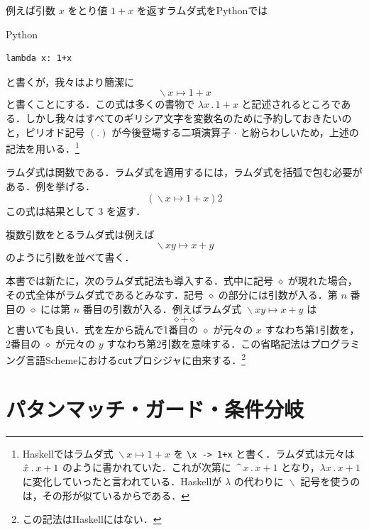 \documentclass[a5paper,twoside,fleqn,draft]{jsbook}
\newcommand{\programminglanguage}[1]{\textsf{#1}}
\newcommand{\haskell}{\programminglanguage{Haskell}}
\newcommand{\python}{\programminglanguage{Python}}
\newcommand{\scheme}{\programminglanguage{Scheme}}
\newcommand{\code}[1]{\texttt{#1}}
\newenvironment{pythoncode}{\begin{itembox}[r]{\python}}{\end{itembox}}
\newcommand{\mAnonParam}{\diamond}
\DeclareMathOperator{\mLambda}{\backslash}
\DeclareMathOperator{\mLambdaArrow}{\mapsto}
\newcommand{\mLambdaEXP}[2]{\mLambda{#1}\mLambdaArrow{#2}} %
\begin{document}
例えば引数 $x$ をとり値 $1+x$ を返すラムダ式を\python では
\begin{pythoncode}
\begin{verbatim}
lambda x: 1+x
\end{verbatim}
\end{pythoncode}
と書くが，我々はより簡潔に
\begin{equation}
  \mLambda x\mLambdaArrow1+x
\end{equation}
と書くことにする．この式は多くの書物で $\lambda x\mathbin{.}1+x$ と記述されるところである．しかし我々はすべてのギリシア文字を変数名のために予約しておきたいのと，ピリオド記号 $(.)$ が今後登場する二項演算子 $\cdot$ と紛らわしいため，上述の記法を用いる．\footnote{\haskell ではラムダ式 $\mLambda x\mLambdaArrow1+x$ を \code{\textbackslash x -> 1+x} と書く．ラムダ式は元々は $\Hat x\mathbin{.}x+1$ のように書かれていた．これが次第に $\mathop{\texttt{\textasciicircum}}x\mathbin{.}x+1$ となり，$\lambda x\mathbin{.}x+1$ に変化していったと言われている．\haskell が $\lambda$ の代わりに $\mLambda$ 記号を使うのは，その形が似ているからである．}

ラムダ式は関数である．ラムダ式を適用するには，ラムダ式を括弧で包む必要がある．例を挙げる．
\begin{equation}
  (\mLambda x\mLambdaArrow1+x)2
\end{equation}
この式は結果として $3$ を返す．

複数引数をとるラムダ式は例えば
\begin{equation}
  \mLambda xy\mLambdaArrow x+y
\end{equation}
のように引数を並べて書く．

本書では新たに，次のラムダ式記法も導入する．式中に記号 $\mAnonParam$ が現れた場合，その式全体がラムダ式であるとみなす．記号 $\mAnonParam$ の部分には引数が入る．第 $n$ 番目の $\mAnonParam$ には第 $n$ 番目の引数が入る．例えばラムダ式 $\mLambdaEXP{xy}{x+y}$ は
\begin{equation}
  \mAnonParam+\mAnonParam
\end{equation}
と書いても良い．式を左から読んで1番目の $\mAnonParam$ が元々の $x$ すなわち第1引数を，2番目の $\mAnonParam$ が元々の $y$ すなわち第2引数を意味する．この省略記法はプログラミング言語\scheme における\code{cut}プロシジャに由来する．\footnote{この記法は\haskell にはない．}

\section{パタンマッチ・ガード・条件分岐}
\end{document}
